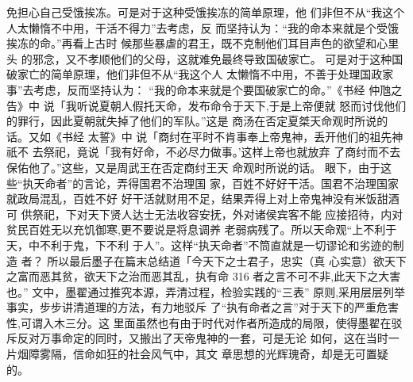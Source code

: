 免担心自己受饿挨冻。可是对于这种受饿挨冻的简单原理，他
们非但不从“我这个人太懒惰不中用，干活不得力”去考虑，反
而坚持认为：“我的命本来就是个受饿挨冻的命。”再看上古时
候那些暴虐的君王，既不克制他们耳目声色的欲望和心里头
的邪念，又不孝顺他们的父母，这就难免最终导致国破家亡。
可是对于这种国破家亡的简单原理，他们非但不从“我这个人
太懒惰不中用，不善于处理国政家事”去考虑，反而坚持认为：
“我的命本来就是个要国破家亡的命。”《书经  仲虺之告》中
说「我听说夏朝人假托天命，发布命令于天下,于是上帝便就
怒而讨伐他们的罪行，因此夏朝就失掉了他们的军队。”这是
商汤在否定夏桀天命观时所说的话。又如《书经  太誓》中
说「商纣在平时不肯事奉上帝鬼神，丢开他们的祖先神祇不
去祭祀，竟说「我有好命，不必尽力做事。'这样上帝也就放弃
了商纣而不去保佑他了。”这些，又是周武王在否定商纣王天
命观时所说的话。
眼下，由于这些“执天命者”的言论，弄得国君不治理国
家，百姓不好好干活。国君不治理国家就政局混乱，百姓不好
好干活就财用不足，结果弄得上对上帝鬼神没有米饭甜酒可
供祭祀，下对天下贤人达士无法收容安抚，外对诸侯宾客不能
应接招待，内对贫民百姓无以充饥御寒,更不要说是将息调养
老弱病残了。所以天命观“上不利于天，中不利于鬼，下不利
于人”。这样“执天命者”不筒直就是一切谬论和劣迹的制造
者？
所以最后墨子在篇末总结道「今天下之士君子，忠实（真
心实意）欲天下之富而恶其贫，欲天下之治而恶其乱，执有命
 316 
者之言不可不非,此天下之大害也。”
文中，墨翟通过推究本源，弄清过程，检验实践的“三表”
原则,采用层层列举事实，步步讲清道理的方法，有力地驳斥
了“执有命者之言”对于天下的严重危害性,可谓入木三分。这
里面虽然也有由于时代对作者所造成的局限，使得墨翟在驳
斥反对万事命定的同时，又搬出了天帝鬼神的一套，可是无论
如何，这在当时一片烟障雾隔，信命如狂的社会风气中，其文
章思想的光辉瑰奇，却是无可置疑的。

